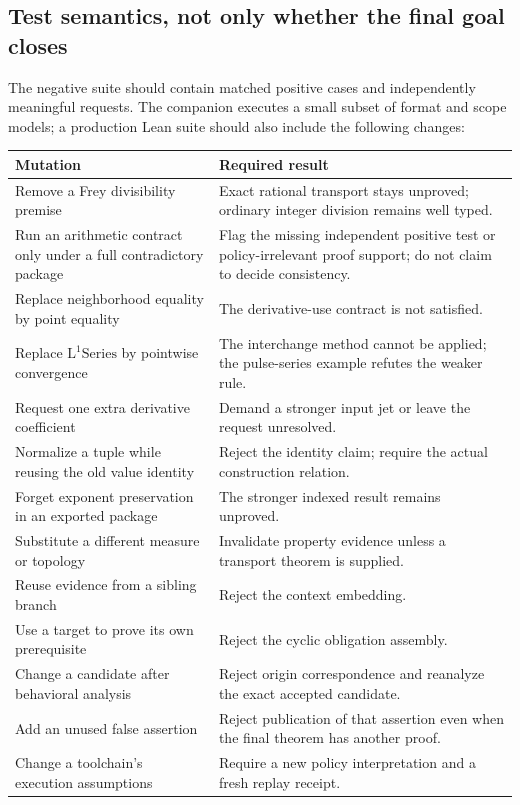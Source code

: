 \documentclass[11pt,a4paper]{article}
\newcommand{\Lone}{\operatorname{L^1Series}}
\theoremstyle{plain}\newtheorem{proposition}{Proposition}[section]
\theoremstyle{definition}\newtheorem{definition}[proposition]{Definition}
\theoremstyle{remark}\newtheorem{remark}[proposition]{Remark}
\begin{document}
\subsection{Test semantics, not only whether the final goal closes}
The negative suite should contain matched positive cases and independently meaningful requests. The companion executes a small subset of format and scope models; a production Lean suite should also include the following changes:
\begin{center}\small
\begin{longtable}{@{}P{.31\textwidth}P{.60\textwidth}@{}}
\toprule
Mutation & Required result\\
\midrule
\endhead
Remove a Frey divisibility premise & Exact rational transport stays unproved; ordinary integer division remains well typed.\\
Run an arithmetic contract only under a full contradictory package & Flag the missing independent positive test or policy-irrelevant proof support; do not claim to decide consistency.\\
Replace neighborhood equality by point equality & The derivative-use contract is not satisfied.\\
Replace \(\Lone\) by pointwise convergence & The interchange method cannot be applied; the pulse-series example refutes the weaker rule.\\
Request one extra derivative coefficient & Demand a stronger input jet or leave the request unresolved.\\
Normalize a tuple while reusing the old value identity & Reject the identity claim; require the actual construction relation.\\
Forget exponent preservation in an exported package & The stronger indexed result remains unproved.\\
Substitute a different measure or topology & Invalidate property evidence unless a transport theorem is supplied.\\
Reuse evidence from a sibling branch & Reject the context embedding.\\
Use a target to prove its own prerequisite & Reject the cyclic obligation assembly.\\
Change a candidate after behavioral analysis & Reject origin correspondence and reanalyze the exact accepted candidate.\\
Add an unused false assertion & Reject publication of that assertion even when the final theorem has another proof.\\
Change a toolchain's execution assumptions & Require a new policy interpretation and a fresh replay receipt.\\
\bottomrule
\end{longtable}
\end{center}
\end{document}
